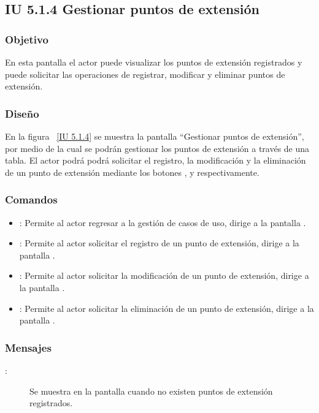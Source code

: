 \newpage 
\subsection{IU 5.1.4 Gestionar puntos de extensión}
\subsubsection{Objetivo}
	
	En esta pantalla el actor puede visualizar los puntos de extensión registrados y puede solicitar las operaciones de registrar, modificar y eliminar puntos de extensión.

\subsubsection{Diseño}

    En la figura ~\ref{IU 5.1.4} se muestra la pantalla ``Gestionar puntos de extensión'', por medio de la cual 
    se podrán gestionar los puntos de extensión a través de una tabla.
    El actor podrá podrá solicitar el registro, la modificación y la eliminación de un punto de extensión mediante los botones
    , \btnEditar y \btnEliminar respectivamente. \\
    



\subsubsection{Comandos}
\begin{itemize}
	\item {}: Permite al actor regresar a la gestión de casos de uso, dirige a la pantalla .
	\item {}: Permite al actor solicitar el registro de un punto de extensión, dirige a la pantalla .
	\item \btnEditar[Modificar]: Permite al actor solicitar la modificación de un punto de extensión, dirige a la pantalla .
	\item \btnEliminar[Eliminar]: Permite al actor solicitar la eliminación de un punto de extensión, dirige a la pantalla .
\end{itemize}

\subsubsection{Mensajes}

	
\begin{description}
	\item[:] Se muestra en la pantalla  cuando no existen puntos de extensión registrados.
\end{description}
